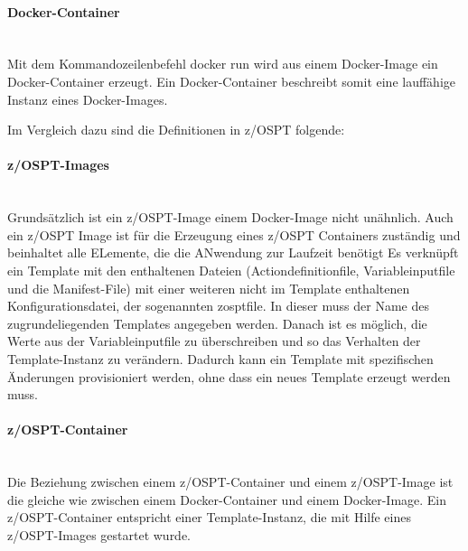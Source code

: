 \paragraph{\glqq Docker-Container\grqq}~\\
Mit dem Kommandozeilenbefehl \glqq docker run\grqq{} wird aus einem Docker-Image ein Docker-Container erzeugt.
Ein Docker-Container beschreibt somit eine lauffähige Instanz eines Docker-Images.
\cite{Vohra.2016}

Im Vergleich dazu sind die Definitionen in z/OSPT folgende:

\paragraph{\glqq z/OSPT-Images\grqq}~\\
Grundsätzlich ist ein z/OSPT-Image einem Docker-Image nicht unähnlich.
Auch ein z/OSPT Image ist für die Erzeugung eines z/OSPT Containers zuständig und beinhaltet alle ELemente, die die ANwendung zur Laufzeit benötigt
Es verknüpft ein Template mit den enthaltenen Dateien (Actiondefinitionfile, Variableinputfile und die Manifest-File) mit einer weiteren nicht im Template enthaltenen Konfigurationsdatei, der sogenannten \glqq zosptfile\grqq.
In dieser muss der Name des zugrundeliegenden Templates angegeben werden.
Danach ist es möglich, die Werte aus der Variableinputfile zu überschreiben und so das Verhalten der Template-Instanz zu verändern.
Dadurch kann ein Template mit spezifischen Änderungen provisioniert werden, ohne dass ein neues Template erzeugt werden muss.

\paragraph{\glqq z/OSPT-Container\grqq}~\\
Die Beziehung zwischen einem z/OSPT-Container und einem z/OSPT-Image ist die gleiche wie zwischen einem Docker-Container und einem Docker-Image.
Ein z/OSPT-Container entspricht einer Template-Instanz, die mit Hilfe eines z/OSPT-Images gestartet wurde.

